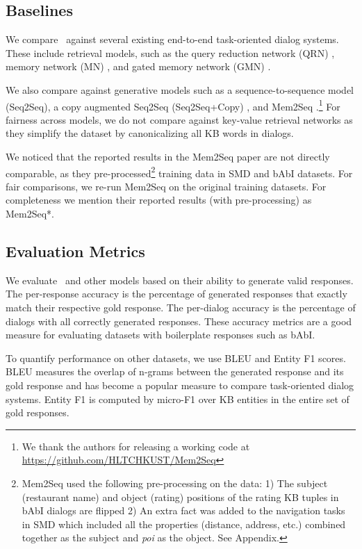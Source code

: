 \subsection{Baselines}
We compare \sys\ against several existing end-to-end task-oriented dialog systems. These include retrieval models, such as the query reduction network (QRN) \cite{seo2016query}, memory network (MN) \cite{BordesW16}, and gated memory network (GMN) \cite{liu2017gated}. 

We also compare against generative models such as a sequence-to-sequence model (Seq2Seq), a copy augmented Seq2Seq (Seq2Seq+Copy) \cite{ptr-unk}, and Mem2Seq \cite{mem2seq}.\footnote{We thank the authors for releasing a working code at \url{https://github.com/HLTCHKUST/Mem2Seq}} For fairness across models, we do not compare against key-value retrieval networks \cite{Ericsigdial} as they simplify the dataset by canonicalizing all KB words in dialogs.

We noticed that the reported results in the Mem2Seq paper are not directly comparable, as they pre-processed\footnote{Mem2Seq used the following pre-processing on the data: 1) The subject (restaurant name) and object (rating) positions of the rating KB tuples in bAbI dialogs are flipped 2) An extra fact was added to the navigation tasks in SMD which included all the properties (distance, address, etc.) combined together  as the subject and \textit{poi} as the object. See Appendix.} training data in SMD and bAbI datasets. For fair comparisons, we re-run Mem2Seq on the original training datasets. For completeness we mention their reported results (with pre-processing) as Mem2Seq*.

\subsection{Evaluation Metrics}
We evaluate \sys\ and other models based on their ability to generate valid responses. The per-response accuracy \cite{BordesW16} is the percentage of generated responses that exactly match their respective gold response. The per-dialog accuracy is the percentage of dialogs with all correctly generated responses. These accuracy metrics are a good measure for evaluating datasets with boilerplate responses such as bAbI. 

To quantify performance on other datasets, we use BLEU \cite{papineni2002bleu} and Entity F1 \cite{eric2017copy} scores. BLEU measures the overlap of n-grams between the generated response and its gold response and has become a popular measure to compare task-oriented dialog systems. Entity F1 is computed by micro-F1 over KB entities in the entire set of gold responses. 

